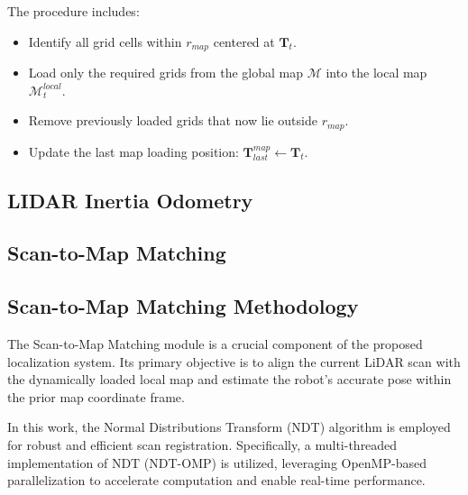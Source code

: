 \begin{itemize}
	The procedure includes:
	\begin{itemize}
		\item Identify all grid cells within $r_{map}$ centered at $\mathbf{T}_t$.
		\item Load only the required grids from the global map $\mathcal{M}$ into the local map $\mathcal{M}_{t}^{local}$.
		\item Remove previously loaded grids that now lie outside $r_{map}$.
		\item Update the last map loading position: $\mathbf{T}_{last}^{map} \gets \mathbf{T}_t$.
	\end{itemize}
	
\end{itemize}


\subsection{LIDAR Inertia Odometry} 

\subsection{Scan-to-Map Matching}
\subsection{Scan-to-Map Matching Methodology}

The Scan-to-Map Matching module is a crucial component of the proposed localization system. Its primary objective is to align the current LiDAR scan with the dynamically loaded local map and estimate the robot's accurate pose within the prior map coordinate frame. 

In this work, the Normal Distributions Transform (NDT) algorithm is employed for robust and efficient scan registration. Specifically, a multi-threaded implementation of NDT (NDT-OMP) \cite{koide2019portable} is utilized, leveraging OpenMP-based parallelization to accelerate computation and enable real-time performance.

